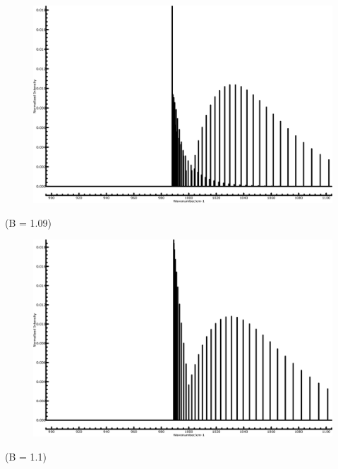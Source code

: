 \begin{center}
	\begin{minipage}{\linewidth}
		\begin{minipage}{0.5\linewidth}
			\begin{figure}[H]
				\centering \includegraphics[width=\linewidth] 						{figures/B109.png}
			\end{figure} 
				\centering(B = 1.09) \\
		\end{minipage}
		\begin{minipage}{0.5\linewidth}
		   \begin{figure}[H]
				\centering \includegraphics[width=\linewidth]	  					{figures/B110.png}
			\end{figure}
				\centering(B = 1.1) \\
		\end{minipage}
	\end{minipage}
\end{center}

